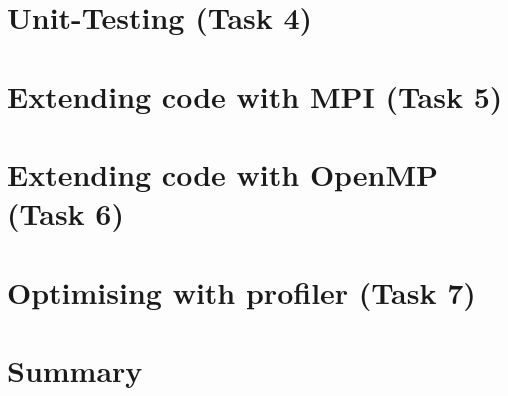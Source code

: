 \documentclass[a4paper,11pt]{report}
\begin{document}
    \newpage
    
    \newcommand{\largedomain}{timingsLx1Ly1Nx201Ny201Re1000dt0_005T5}
    \newcommand{\smalldomain}{timingsLx1Ly1Nx101Ny101Re500dt0_005T5}
    \vspace*{-0.3cm}
    \section{Unit-Testing (Task 4)}
    
    \vspace*{-0.3cm}
    \section{Extending code with MPI (Task 5)}
    

    \vspace*{-0.3cm}
    \section{Extending code with OpenMP (Task 6)}
    

    \vspace*{-0.3cm}
    \section{Optimising with profiler (Task 7)}
    

     \vspace*{-0.3cm}
     \section{Summary}
     
    
\end{document}
